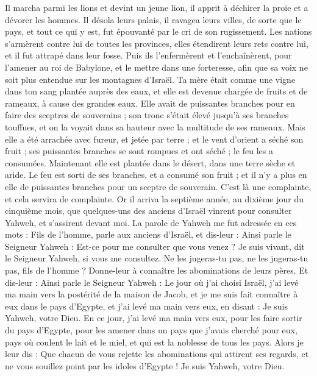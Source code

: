 \begin{multicols}{2}
Il marcha parmi les lions et devint un jeune lion, il apprit à déchirer la proie et a dévorer les hommes.
Il désola leurs palais, il ravagea leurs villes, de sorte que le pays, et tout ce qui y est, fut épouvanté par le cri de son rugissement.
Les nations s’armèrent contre lui de toutes les provinces, elles étendirent leurs rets contre lui, et il fut attrapé dans leur fosse.
Puis ils l’enfermèrent et l’enchaînèrent, pour l'amener au roi de Babylone, et le mettre dans une forteresse, afin que sa voix ne soit plus entendue sur les montagnes d'Israël.
Ta mère était comme une vigne dans ton sang plantée auprès des eaux, et elle est devenue chargée de fruits et de rameaux, à cause des grandes eaux.
Elle avait de puissantes branches pour en faire des sceptres de souverains ; son tronc s'était élevé jusqu'à ses branches touffues, et on la voyait dans sa hauteur avec la multitude de ses rameaux.
Mais elle a été arrachée avec fureur, et jetée par terre ; et le vent d'orient a séché son fruit ; ses puissantes branches se sont rompues et ont séché ; le feu les a consumées.
Maintenant elle est plantée dans le désert, dans une terre sèche et aride.
Le feu est sorti de ses branches, et a consumé son fruit ; et il n'y a plus en elle de puissantes branches pour un sceptre de souverain. C'est là une complainte, et cela servira de complainte.
\VerseOne{}Or il arriva la septième année, au dixième jour du cinquième mois, que quelques-uns des anciens d'Israël vinrent pour consulter Yahweh, et s'assirent devant moi.
La parole de Yahweh me fut adressée en ces mots :
Fils de l’homme, parle aux anciens d'Israël, et dis-leur : Ainsi parle le Seigneur Yahweh : Est-ce pour me consulter que vous venez ? Je suis vivant, dit le Seigneur Yahweh, si vous me consultez.
Ne les jugeras-tu pas, ne les jugeras-tu pas, fils de l’homme ? Donne-leur à connaître les abominations de leurs pères.
Et dis-leur : Ainsi parle le Seigneur Yahweh : Le jour où j’ai choisi Israël, j’ai levé ma main vers la postérité de la maison de Jacob, et je me suis fait connaître à eux dans le pays d'Egypte, et j’ai levé ma main vers eux, en disant : Je suis Yahweh, votre Dieu.
En ce jour, j’ai levé ma main vers eux, pour les faire sortir du pays d'Egypte, pour les amener dans un pays que j'avais cherché pour eux, pays où coulent le lait et le miel, et qui est la noblesse de tous les pays.
Alors je leur dis : Que chacun de vous rejette les abominations qui attirent ses regards, et ne vous souillez point par les idoles d'Egypte ! Je suis Yahweh, votre Dieu.

\end{multicols}
